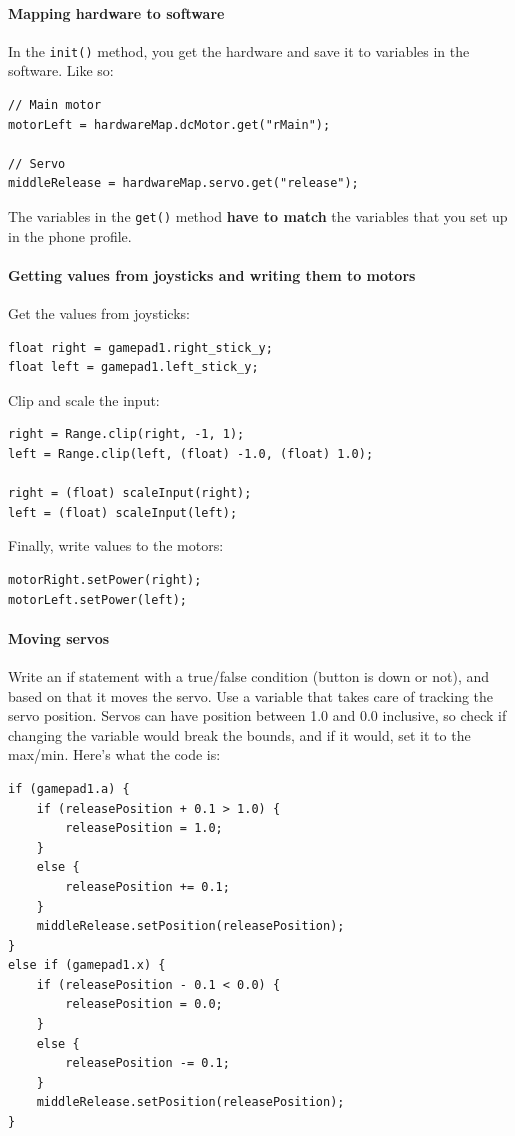 \documentclass[12p,a4paper]{article}
\begin{document}
\paragraph{Mapping hardware to software}In the \verb!init()! method, you get the hardware and save it to variables in the software. Like so:
\begin{verbatim}
// Main motor
motorLeft = hardwareMap.dcMotor.get("rMain");

// Servo
middleRelease = hardwareMap.servo.get("release");
\end{verbatim}
The variables in the \verb!get()! method \textbf{have to match} the variables that you set up in the phone profile.
\paragraph{Getting values from joysticks and writing them to motors}
Get the values from joysticks:
\begin{verbatim}
float right = gamepad1.right_stick_y;
float left = gamepad1.left_stick_y;
\end{verbatim}
Clip and scale the input:
\begin{verbatim}
right = Range.clip(right, -1, 1);
left = Range.clip(left, (float) -1.0, (float) 1.0);
        
right = (float) scaleInput(right);
left = (float) scaleInput(left);
\end{verbatim}
Finally, write values to the motors:
\begin{verbatim}
motorRight.setPower(right);
motorLeft.setPower(left);
\end{verbatim}
\paragraph{Moving servos} Write an if statement with a true/false condition (button is down or not), and based on that it moves the servo. Use a variable that takes care of tracking the servo position. Servos can have position between 1.0 and 0.0 inclusive, so check if changing the variable would break the bounds, and if it would, set it to the max/min. Here's what the code is:
\begin{verbatim}
if (gamepad1.a) {
	if (releasePosition + 0.1 > 1.0) {
		releasePosition = 1.0;
	} 
	else {
		releasePosition += 0.1;
	}
	middleRelease.setPosition(releasePosition);
} 
else if (gamepad1.x) {
	if (releasePosition - 0.1 < 0.0) {
		releasePosition = 0.0;
	} 
	else {
		releasePosition -= 0.1;
	}
	middleRelease.setPosition(releasePosition);
}
\end{verbatim}
\end{document}
